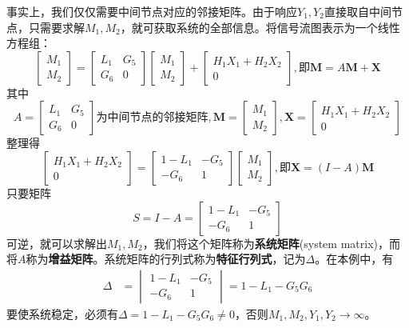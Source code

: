 \documentclass{ctexbook}
\begin{document}
\begin{example}
    事实上，我们仅仅需要中间节点对应的邻接矩阵。由于响应$Y_1,Y_2$直接取自中间节点，只需要求解$M_1,M_2$，就可获取系统的全部信息。将信号流图表示为一个线性方程组：
    \[\begin{bmatrix}
        M_1 \\
        M_2
    \end{bmatrix}=
    \begin{bmatrix}
        L_1 & G_5\\
        G_6 & 0
    \end{bmatrix}
    \begin{bmatrix}
        M_1 \\
        M_2
    \end{bmatrix}+\begin{bmatrix}
        H_1 X_1 + H_2 X_2 \\
        0
    \end{bmatrix},\text{即}\mathbf{M}=A\mathbf{M}+\mathbf{X}\]
    其中$$A=\begin{bmatrix}
        L_1 & G_5\\
        G_6 & 0
    \end{bmatrix}\text{为中间节点的邻接矩阵},\mathbf{M}=\begin{bmatrix}
        M_1 \\
        M_2
    \end{bmatrix},\mathbf{X}=\begin{bmatrix}
        H_1 X_1 + H_2 X_2 \\
        0
    \end{bmatrix}$$
    整理得\[\begin{bmatrix}
        H_1 X_1 + H_2 X_2 \\
        0
    \end{bmatrix}=\begin{bmatrix}
        1 -L_1 & -G_5\\
        -G_6 & 1
    \end{bmatrix}\begin{bmatrix}
        M_1 \\
        M_2
    \end{bmatrix},\text{即}\mathbf{X}=(I-A)\mathbf{M}\]
    只要矩阵\[S=I-A=\begin{bmatrix}
        1 -L_1 & -G_5\\
        -G_6 & 1
    \end{bmatrix}\]
    可逆，就可以求解出$M_1,M_2$，我们将这个矩阵称为\textbf{系统矩阵}(system matrix)，而将$A$称为\textbf{增益矩阵}。系统矩阵的行列式称为\textbf{特征行列式}，记为$\Delta$。在本例中，有\begin{align*}
        \Delta&=\begin{vmatrix}
        1 -L_1 & -G_5 \\
        -G_6 & 1
    \end{vmatrix}=1-L_1-G_5 G_6
    \end{align*}
    要使系统稳定，必须有$\Delta=1-L_1-G_5 G_6\neq 0$，否则$M_1,M_2,Y_1,Y_2\to\infty$。
\end{example}
\end{document}
